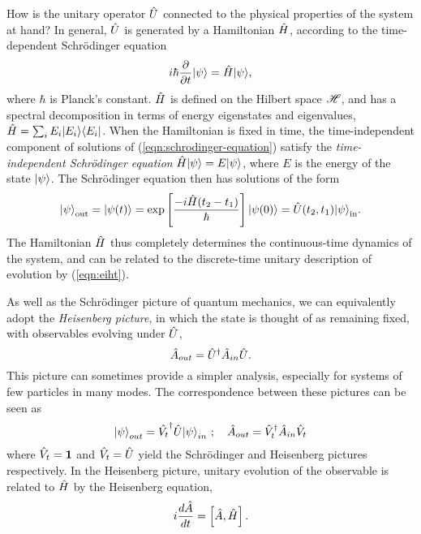 How is the unitary operator $\hat{U}$ connected to the physical properties of the system at hand?
In general, $\hat{U}$ is generated by a Hamiltonian $\hat{H}$, according to the time-dependent Schr\"odinger equation
\begin{equation}
   i \hbar \frac{\partial}{\partial t} \mbox{$ | \psi \rangle $} = \hat{H} \mbox{$ | \psi \rangle $},
   \label{eqn:schrodinger-equation}
\end{equation}
where $\hbar$ is Planck's constant. $\hat{H}$ is defined on the Hilbert space $\mathscr{H}$, and has a spectral decomposition in terms of energy eigenstates and eigenvalues, $\hat{H} = \sum_i E_i \mbox{$ | E_i \rangle $}\mbox{$ \langle E_i | $}$. 
When the Hamiltonian is fixed in time, the time-independent component of solutions of (\ref{eqn:schrodinger-equation}) satisfy the \emph{time-independent Schr\"odinger equation}
$\hat{H} \mbox{$ | \psi \rangle $}  = E \mbox{$ | \psi \rangle $}$,
where $E$ is the energy of the state $\mbox{$ | \psi \rangle $}$. 
The Schr\"odinger equation then has solutions of the form
\begin{equation}
    \mbox{$ | \psi \rangle $}_{\mathrm{out}} = \mbox{$ | \psi(t) \rangle $} = 
    \mathrm{exp} \left[ \frac{-i \hat{H} (t_2-t_1) }{\hbar} \right]
    \mbox{$ | \psi(0) \rangle $}
    = \hat{U}(t_2, t_1) \mbox{$ | \psi \rangle $}_{\mathrm{in}}.
    \label{eqn:eiht}
\end{equation}
The Hamiltonian $\hat{H}$ thus completely determines the continuous-time dynamics of the system, and can be related to the discrete-time unitary description of evolution  by (\ref{eqn:eiht}).

As well as the Schr\"odinger picture of quantum mechanics, we can equivalently adopt the \emph{Heisenberg picture}, in which the state is thought of as remaining fixed, with observables evolving under $\hat{U}$,
\begin{equation}
\hat{A}_{out} = \hat{U}^\dagger \hat{A}_{in} \hat{U}.
\end{equation}
This picture can sometimes provide a simpler analysis, especially for systems of few particles in many modes. The correspondence between these pictures can be seen as
\begin{equation}
    \mbox{$ | \psi \rangle $}_{out} = \hat{V_t}^\dagger \hat{U} \mbox{$ | \psi \rangle $}_{in} ~; \quad \hat{A}_{out} = \hat{V}_t^\dagger \hat{A}_{in} \hat{V}_t
\end{equation}
where $\hat{V}_t = \mathbf{1}$ and $\hat{V}_t = \hat{U}$ yield the Schr\"odinger and Heisenberg pictures respectively.
In the Heisenberg picture, unitary evolution of the observable is related to $\hat{H}$ by the Heisenberg equation,
\begin{equation}
   i\frac{d\hat{A}}{dt} = \left[ \hat{A}, \hat{H} \right].
   \label{eqn:heisenberg-equation}
\end{equation}

